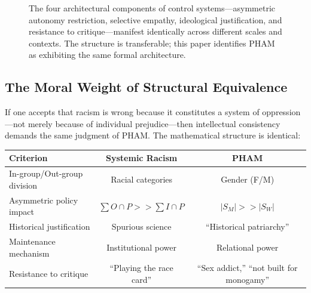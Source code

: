 \documentclass[12pt,openany]{book}
\numberwithin{equation}{chapter}
\begin{document}
\begin{figure}[H]
\caption{The four architectural components of control systems---asymmetric autonomy restriction, selective empathy, ideological justification, and resistance to critique---manifest identically across different scales and contexts. The structure is transferable; this paper identifies PHAM as exhibiting the same formal architecture.}
\end{figure}

\subsection{The Moral Weight of Structural Equivalence}

If one accepts that racism is wrong because it constitutes a system of oppression---not merely because of individual prejudice---then intellectual consistency demands the same judgment of PHAM. The mathematical structure is identical:

\begin{center}
\begin{tabular}{lcc}
\toprule
\textbf{Criterion} & \textbf{Systemic Racism} & \textbf{PHAM} \\
\midrule
In-group/Out-group division & Racial categories & Gender (F/M) \\
Asymmetric policy impact & $\sum O \cap P >> \sum I \cap P$ & $|S_M| >> |S_W|$ \\
Historical justification & Spurious science & ``Historical patriarchy'' \\
Maintenance mechanism & Institutional power & Relational power \\
Resistance to critique & ``Playing the race card'' & ``Sex addict,'' ``not built for monogamy'' \\
\bottomrule
\end{tabular}
\end{center}
\end{document}
